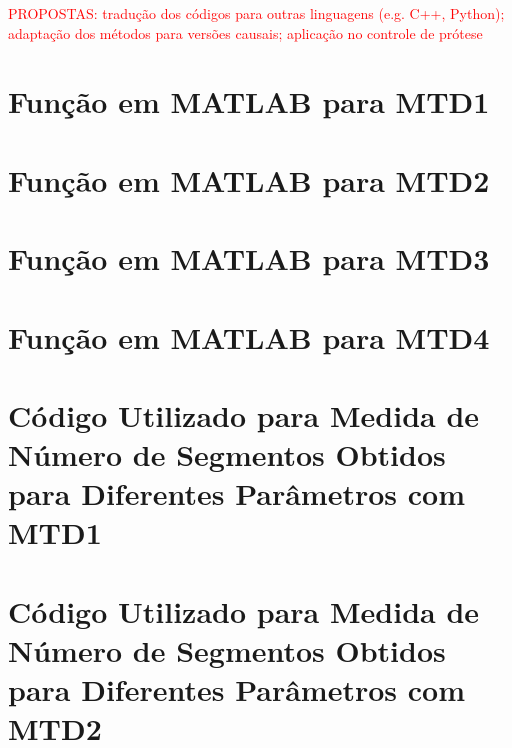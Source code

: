 \textcolor{red}{PROPOSTAS: tradução dos códigos para outras linguagens (e.g. C++, Python); adaptação dos métodos para versões causais; aplicação no controle de prótese}

	\postextual
	

	\begin{apendicesenv}
	\partapendices
\chapter{Função em MATLAB para MTD1}

\label{ap:seg_mtd1}
\chapter{Função em MATLAB para MTD2}

\label{ap:seg_mtd2}
\chapter{Função em MATLAB para MTD3}

\label{ap:seg_mtd3}
\chapter{Função em MATLAB para MTD4}
%
\label{ap:seg_mtd4}
\chapter{Código Utilizado para Medida de Número de Segmentos Obtidos para Diferentes Parâmetros com MTD1}

\label{ap:num_mtd1}
\chapter{Código Utilizado para Medida de Número de Segmentos Obtidos para Diferentes Parâmetros com MTD2}

\label{ap:num_mtd2}

\end{apendicesenv}

